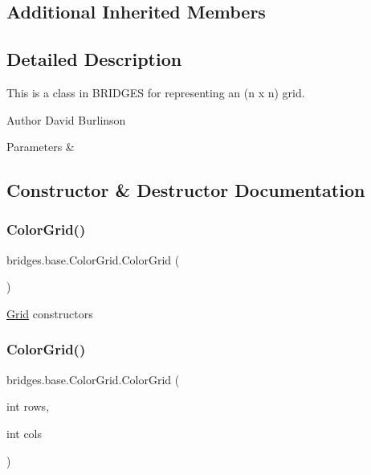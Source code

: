 \subsection*{Additional Inherited Members}


\subsection{Detailed Description}
This is a class in B\+R\+I\+D\+G\+ES for representing an (n x n) grid. 

\begin{DoxyAuthor}{Author}
David Burlinson 
\end{DoxyAuthor}

\begin{DoxyParams}{Parameters}
{\em } & \\
\hline
\end{DoxyParams}


\subsection{Constructor \& Destructor Documentation}
\mbox{\label{classbridges_1_1base_1_1_color_grid_af434a5a3dcbaf86e51ac6f9e1c1d7e5f}} 
\subsubsection{\texorpdfstring{Color\+Grid()}{ColorGrid()}\hspace{0.1cm}{\footnotesize\ttfamily [1/3]}}
{\footnotesize\ttfamily bridges.\+base.\+Color\+Grid.\+Color\+Grid (\begin{DoxyParamCaption}{ }\end{DoxyParamCaption})}

\mbox{\hyperlink{classbridges_1_1base_1_1_grid}{Grid}} constructors \mbox{\label{classbridges_1_1base_1_1_color_grid_aafb4157a4c8129f30c1f989fcdfda544}} 
\subsubsection{\texorpdfstring{Color\+Grid()}{ColorGrid()}\hspace{0.1cm}{\footnotesize\ttfamily [2/3]}}
{\footnotesize\ttfamily bridges.\+base.\+Color\+Grid.\+Color\+Grid (\begin{DoxyParamCaption}\item[{int}]{rows,  }\item[{int}]{cols }\end{DoxyParamCaption})}

